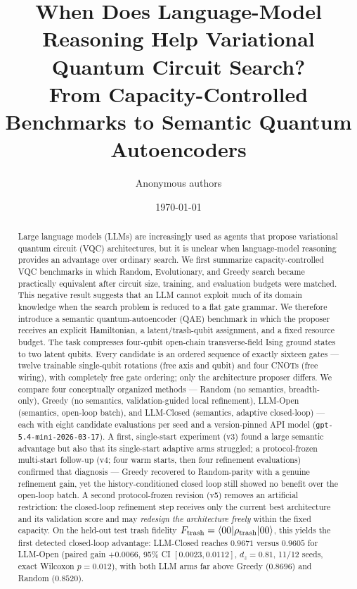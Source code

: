 \documentclass[11pt]{article}
\title{When Does Language-Model Reasoning Help Variational Quantum Circuit Search?\\
From Capacity-Controlled Benchmarks to Semantic Quantum Autoencoders}
\author{Anonymous authors}
\date{\today}
\begin{document}
\maketitle

\begin{abstract}
Large language models (LLMs) are increasingly used as agents that propose variational quantum circuit (VQC) architectures, but it is unclear when language-model reasoning provides an advantage over ordinary search.
We first summarize capacity-controlled VQC benchmarks in which Random, Evolutionary, and Greedy search became practically equivalent after circuit size, training, and evaluation budgets were matched.
This negative result suggests that an LLM cannot exploit much of its domain knowledge when the search problem is reduced to a flat gate grammar.
We therefore introduce a semantic quantum-autoencoder (QAE) benchmark in which the proposer receives an explicit Hamiltonian, a latent/trash-qubit assignment, and a fixed resource budget.
The task compresses four-qubit open-chain transverse-field Ising ground states to two latent qubits.
Every candidate is an ordered sequence of exactly sixteen gates --- twelve trainable single-qubit rotations (free axis and qubit) and four CNOTs (free wiring), with completely free gate ordering; only the architecture proposer differs.
We compare four conceptually organized methods --- Random (no semantics, breadth-only), Greedy (no semantics, validation-guided local refinement), LLM-Open (semantics, open-loop batch), and LLM-Closed (semantics, adaptive closed-loop) --- each with eight candidate evaluations per seed and a version-pinned API model (\texttt{gpt-5.4-mini-2026-03-17}).
A first, single-start experiment (v3) found a large semantic advantage but also that its single-start adaptive arms struggled; a protocol-frozen multi-start follow-up (v4; four warm starts, then four refinement evaluations) confirmed that diagnosis --- Greedy recovered to Random-parity with a genuine refinement gain, yet the history-conditioned closed loop still showed no benefit over the open-loop batch.
A second protocol-frozen revision (v5) removes an artificial restriction: the closed-loop refinement step receives only the current best architecture and its validation score and may \emph{redesign the architecture freely} within the fixed capacity.
On the held-out test trash fidelity $F_{\rm trash}=\langle 00|\rho_{\rm trash}|00\rangle$, this yields the first detected closed-loop advantage: LLM-Closed reaches $0.9671$ versus $0.9605$ for LLM-Open (paired gain $+0.0066$, 95\% CI $[0.0023, 0.0112]$, $d_z=0.81$, 11/12 seeds, exact Wilcoxon $p=0.012$), with both LLM arms far above Greedy ($0.8696$) and Random ($0.8520$).

\end{abstract}
\end{document}
